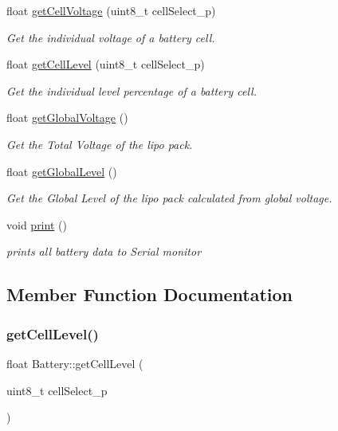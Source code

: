 \begin{DoxyCompactItemize}
float \hyperlink{class_battery_ae449209593f825ca7cefc958d51ba232}{get\+Cell\+Voltage} (uint8\+\_\+t cell\+Select\+\_\+p)
\begin{DoxyCompactList}\small\item\em Get the individual voltage of a battery cell. \end{DoxyCompactList}\item 
float \hyperlink{class_battery_a810c22577141039b044fdf59a9f9bdef}{get\+Cell\+Level} (uint8\+\_\+t cell\+Select\+\_\+p)
\begin{DoxyCompactList}\small\item\em Get the individual level percentage of a battery cell. \end{DoxyCompactList}\item 
float \hyperlink{class_battery_a288d5d3b5ebbe964751a9d64519aacdb}{get\+Global\+Voltage} ()
\begin{DoxyCompactList}\small\item\em Get the Total Voltage of the lipo pack. \end{DoxyCompactList}\item 
float \hyperlink{class_battery_a16e5bfb8a07ce93c08382fbcfb0b19be}{get\+Global\+Level} ()
\begin{DoxyCompactList}\small\item\em Get the Global Level of the lipo pack calculated from global voltage. \end{DoxyCompactList}\item 
void \hyperlink{class_battery_a66ad0266d08fe7d72c90d54654dffcea}{print} ()
\begin{DoxyCompactList}\small\item\em prints all battery data to Serial monitor \end{DoxyCompactList}\end{DoxyCompactItemize}


\subsection{Member Function Documentation}
\mbox{\label{class_battery_a810c22577141039b044fdf59a9f9bdef}} 
\subsubsection{\texorpdfstring{get\+Cell\+Level()}{getCellLevel()}}
{\footnotesize\ttfamily float Battery\+::get\+Cell\+Level (\begin{DoxyParamCaption}\item[{uint8\+\_\+t}]{cell\+Select\+\_\+p }\end{DoxyParamCaption})}



